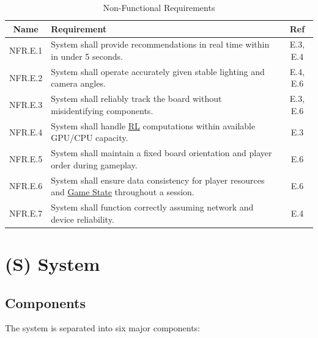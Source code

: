 \documentclass{article}
\newcommand{\RL}{\href{https://www.ibm.com/think/topics/reinforcement-learning}{RL}}
\newcommand{\GameState}{\href{https://milvus.io/ai-quick-reference/what-is-a-state-in-rl}{Game State}}
\begin{document}
    
    \begin{table}[h!]
    \centering
    \begin{tabular}{|c|p{10cm}|c|}
    \hline
    \textbf{Name} & \textbf{Requirement} & \textbf{Ref} \\
    \hline
    NFR.E.1 & System shall provide recommendations in real time within in under 5 seconds. & E.3, E.4 \\
    \hline
    NFR.E.2 & System shall operate accurately given stable lighting and camera angles. & E.4, E.6 \\
    \hline
    NFR.E.3 & System shall reliably track the board without misidentifying components. & E.3, E.6 \\
    \hline
    NFR.E.4 & System shall handle \RL{} computations within available GPU/CPU capacity. & E.3 \\
    \hline
    NFR.E.5 & System shall maintain a fixed board orientation and player order during gameplay. & E.6 \\
    \hline
    NFR.E.6 & System shall ensure data consistency for player resources and \GameState{} throughout a session. & E.6 \\
    \hline
    NFR.E.7 & System shall function correctly assuming network and device reliability. & E.4 \\
    \hline
    \end{tabular}
    \caption{Non-Functional Requirements}
    \label{tab:nfr}
    \end{table}
    
    
\newpage{}




\section*{(S) System}\label{sec:srs-system}
\renewcommand{\thesubsection}{S.\arabic{subsection}}
\setcounter{subsection}{0}

\subsection{Components}\label{subsec:components}
The system is separated into six major components:
\end{document}
